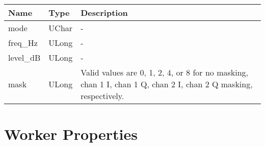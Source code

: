 \documentclass{article}
\begin{document}
\begin{landscape}
		\begin{scriptsize}
			\begin{tabular}{|p{4.7cm}|p{2.7cm}|p{13.77cm}|} \hline \cellcolor{blue} Name & \cellcolor{blue}Type & \cellcolor{blue}Description\\ \hline mode & UChar & - \\ \hline freq\_Hz & ULong & -\\ \hline level\_dB & ULong & -\\ \hline mask & ULong & Valid values are 0, 1, 2, 4, or 8 for no masking, chan 1 I, chan 1 Q, chan 2 I, chan 2 Q masking, respectively.\\ \hline\end{tabular}
				\end{scriptsize}
				\pagebreak
	\section*{Worker Properties}

\end{landscape}
\end{document}
